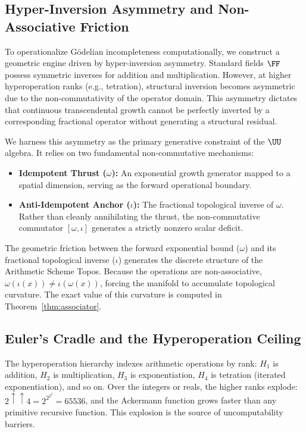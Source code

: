 \subsection{Hyper-Inversion Asymmetry and Non-Associative Friction}

To operationalize G\"odelian incompleteness computationally, we construct a geometric engine driven by hyper-inversion asymmetry. Standard fields $\FF$ possess symmetric inverses for addition and multiplication. However, at higher hyperoperation ranks (e.g., tetration), structural inversion becomes asymmetric due to the non-commutativity of the operator domain. This asymmetry dictates that continuous transcendental growth cannot be perfectly inverted by a corresponding fractional operator without generating a structural residual.

We harness this asymmetry as the primary generative constraint of the $\UU$ algebra. It relies on two fundamental non-commutative mechanisms:
\begin{itemize}
\item \textbf{Idempotent Thrust ($\omega$):} An exponential growth generator mapped to a spatial dimension, serving as the forward operational boundary.
\item \textbf{Anti-Idempotent Anchor ($\iota$):} The fractional topological inverse of $\omega$. Rather than cleanly annihilating the thrust, the non-commutative commutator $[\omega, \iota]$ generates a strictly nonzero scalar deficit.
\end{itemize}

The geometric friction between the forward exponential bound ($\omega$) and its fractional topological inverse ($\iota$) generates the discrete structure of the Arithmetic Scheme Topos. Because the operations are non-associative, $\omega(\iota(x)) \neq \iota(\omega(x))$, forcing the manifold to accumulate topological curvature. The exact value of this curvature is computed in Theorem~\ref{thm:associator}.

\subsection{Euler's Cradle and the Hyperoperation Ceiling}\label{sec:euler-cradle}

The hyperoperation hierarchy indexes arithmetic operations by rank: $H_1$ is addition, $H_2$ is multiplication, $H_3$ is exponentiation, $H_4$ is tetration (iterated exponentiation), and so on. Over the integers or reals, the higher ranks explode: $2 \uparrow\uparrow 4 = 2^{2^{2^{2}}} = 65536$, and the Ackermann function grows faster than any primitive recursive function. This explosion is the source of uncomputability barriers.

